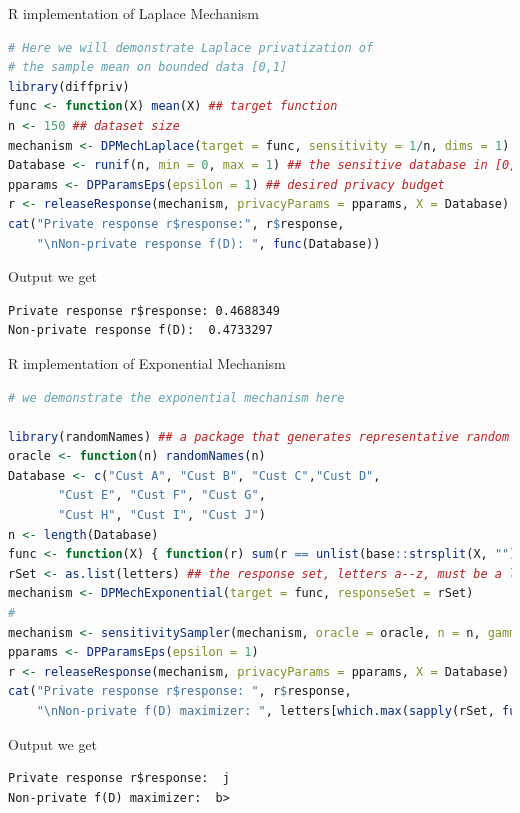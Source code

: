 \documentclass[aspectratio=169]{beamer}
\begin{document}
\begin{frame}[fragile]{R implementation of Laplace Mechanism}
\begin{lstlisting}[language=R]
# Here we will demonstrate Laplace privatization of
# the sample mean on bounded data [0,1]
library(diffpriv)
func <- function(X) mean(X) ## target function
n <- 150 ## dataset size
mechanism <- DPMechLaplace(target = func, sensitivity = 1/n, dims = 1)
Database <- runif(n, min = 0, max = 1) ## the sensitive database in [0,1]^n
pparams <- DPParamsEps(epsilon = 1) ## desired privacy budget
r <- releaseResponse(mechanism, privacyParams = pparams, X = Database)
cat("Private response r$response:", r$response,
    "\nNon-private response f(D): ", func(Database))
\end{lstlisting}

Output we get
\begin{verbatim}
Private response r$response: 0.4688349 
Non-private response f(D):  0.4733297
\end{verbatim}
\end{frame}


\begin{frame}{R implementation of Exponential Mechanism}
\begin{lstlisting}[language=R]
# we demonstrate the exponential mechanism here

library(randomNames) ## a package that generates representative random names
oracle <- function(n) randomNames(n)
Database <- c("Cust A", "Cust B", "Cust C","Cust D",
       "Cust E", "Cust F", "Cust G",
       "Cust H", "Cust I", "Cust J")
n <- length(Database)
func <- function(X) { function(r) sum(r == unlist(base::strsplit(X, ""))) }
rSet <- as.list(letters) ## the response set, letters a--z, must be a list
mechanism <- DPMechExponential(target = func, responseSet = rSet)
# 
mechanism <- sensitivitySampler(mechanism, oracle = oracle, n = n, gamma = 0.1)
pparams <- DPParamsEps(epsilon = 1)
r <- releaseResponse(mechanism, privacyParams = pparams, X = Database)
cat("Private response r$response: ", r$response,
    "\nNon-private f(D) maximizer: ", letters[which.max(sapply(rSet, func(Database)))])
\end{lstlisting}

Output we get
\begin{verbatim}
Private response r$response:  j 
Non-private f(D) maximizer:  b>
\end{verbatim}
\end{frame}
\end{document}
